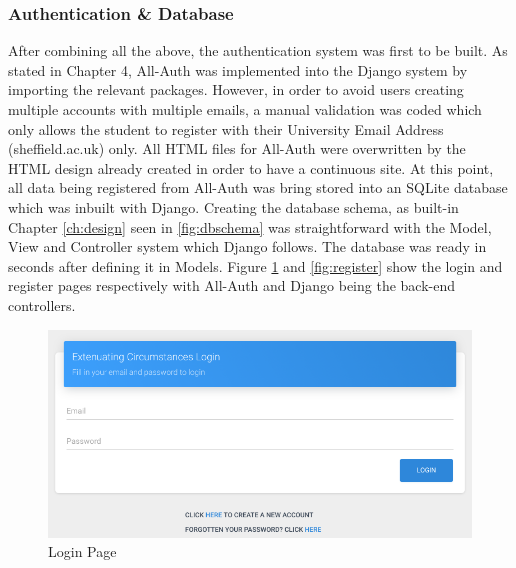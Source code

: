 \documentclass[../main.tex]{subfiles}
\begin{document}
\subsubsection{Authentication \& Database}
After combining all the above, the authentication system was first to be built. As stated in Chapter 4, All-Auth\cite{allauth} was implemented into the Django system by importing the relevant packages. However, in order to avoid users creating multiple accounts with multiple emails, a manual validation was coded which only allows the student to register with their University Email Address (sheffield.ac.uk) only. All HTML files for All-Auth were overwritten by the HTML design already created in order to have a continuous site. At this point, all data being registered from All-Auth was bring stored into an SQLite database which was inbuilt with Django. Creating the database schema, as built-in Chapter \ref{ch:design} seen in \ref{fig:dbschema} was straightforward with the Model, View and Controller system which Django follows. The database was ready in seconds after defining it in Models. Figure \ref{fig:login} and \ref{fig:register} show the login and register pages respectively with All-Auth and Django being the back-end controllers. 


 \begin{figure}[H]
 	\begin{center}
        \includegraphics[scale=1]
        {images/login.png}
        \caption{\label{fig:login} Login Page}
     \end{center} 
      \end{figure} 
\end{document}

